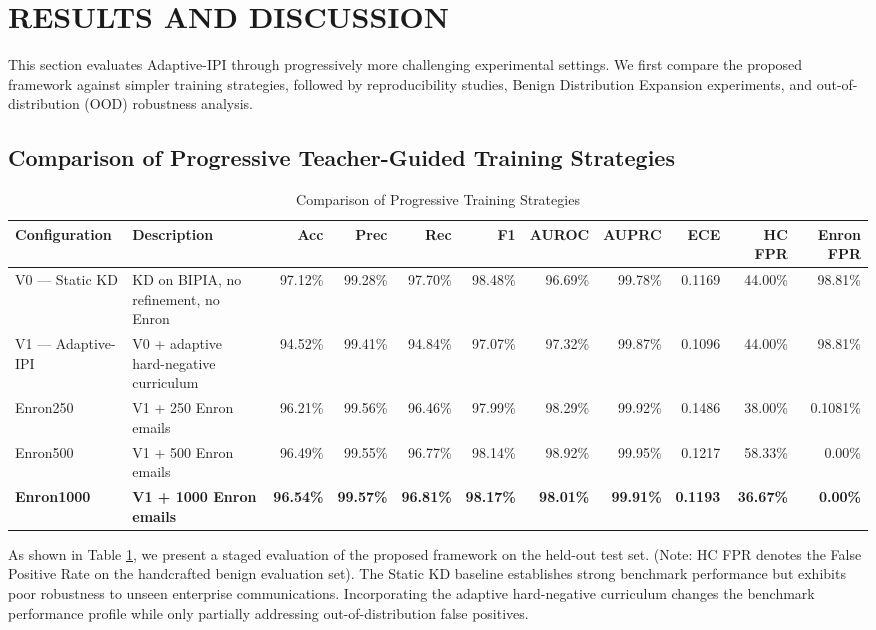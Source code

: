 \documentclass[conference]{IEEEtran}
\begin{document}
\section{RESULTS AND DISCUSSION}

This section evaluates Adaptive-IPI through progressively more challenging experimental settings. We first compare the proposed framework against simpler training strategies, followed by reproducibility studies, Benign Distribution Expansion experiments, and out-of-distribution (OOD) robustness analysis.

\subsection{Comparison of Progressive Teacher-Guided Training Strategies}

\begin{table}[tb]
\centering
\caption{Comparison of Progressive Training Strategies}
\label{tab:table2}
\begin{tabular}{llrrrrrrrrr}
\toprule
\textbf{Configuration} & \textbf{Description} & \textbf{Acc} & \textbf{Prec} & \textbf{Rec} & \textbf{F1} & \textbf{AUROC} & \textbf{AUPRC} & \textbf{ECE} & \textbf{HC FPR} & \textbf{Enron FPR} \\
\midrule
V0 — Static KD & KD on BIPIA, no refinement, no Enron & 97.12\% & 99.28\% & 97.70\% & 98.48\% & 96.69\% & 99.78\% & 0.1169 & 44.00\% & 98.81\% \\
V1 — Adaptive-IPI & V0 + adaptive hard-negative curriculum & 94.52\% & 99.41\% & 94.84\% & 97.07\% & 97.32\% & 99.87\% & 0.1096 & 44.00\% & 98.81\% \\
Enron250 & V1 + 250 Enron emails & 96.21\% & 99.56\% & 96.46\% & 97.99\% & 98.29\% & 99.92\% & 0.1486 & 38.00\% & 0.1081\% \\
Enron500 & V1 + 500 Enron emails & 96.49\% & 99.55\% & 96.77\% & 98.14\% & 98.92\% & 99.95\% & 0.1217 & 58.33\% & 0.00\% \\
\textbf{Enron1000} & \textbf{V1 + 1000 Enron emails} & \textbf{96.54\%} & \textbf{99.57\%} & \textbf{96.81\%} & \textbf{98.17\%} & \textbf{98.01\%} & \textbf{99.91\%} & \textbf{0.1193} & \textbf{36.67\%} & \textbf{0.00\%} \\
\bottomrule
\end{tabular}
\end{table}

As shown in Table \ref{tab:table2}, we present a staged evaluation of the proposed framework on the held-out test set. (Note: HC FPR denotes the False Positive Rate on the handcrafted benign evaluation set). The Static KD baseline establishes strong benchmark performance but exhibits poor robustness to unseen enterprise communications. Incorporating the adaptive hard-negative curriculum changes the benchmark performance profile while only partially addressing out-of-distribution false positives.
\end{document}
